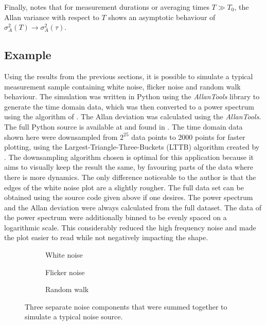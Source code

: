 Finally, \citeauthor{psd_to_adev} \cite{psd_to_adev} notes that for measurement durations or averaging times $T \gg T_0$, the Allan variance with respect to $T$ shows an asymptotic behaviour of $\sigma_A^2(T) \to \sigma_A^2(\tau)$.

\subsection{Example}%
\label{sec:noise_example}
Using the results from the previous sections, it is possible to simulate a typical measurement sample containing white noise, flicker noise and random walk behaviour. The simulation was written in Python using the \textit{AllanTools} library \cite{allantools} to generate the time domain data, which was then converted to a power spectrum using the algorithm of \citeauthor{welch} \cite{welch}. The Allan deviation was calculated using the \textit{AllanTools}. The full Python source is available at \cite{supplemental_material} and found in . The time domain data shown here were downsampled from $2^{25}$ data points to \num{2000} points for faster plotting, using the Largest-Triangle-Three-Buckets (LTTB) algorithm created by \citeauthor{lttb} \cite{lttb}. The downsampling algorithm chosen is optimal for this application because it aims to visually keep the result the same, by favouring parts of the data where there is more dynamics. The only difference noticeable to the author is that the edges of the white noise plot are a slightly rougher. The full data set can be obtained using the source code given above if one desires. The power spectrum and the Allan deviation were always calculated from the full dataset. The data of the power spectrum were additionally binned to be evenly spaced on a logarithmic scale. This considerably reduced the high frequency noise and made the plot easier to read while not negatively impacting the shape.

\begin{figure}[ht]
    \centering
    \begin{subfigure}{0.32\linewidth}
        \centering
        \scalebox{0.75}{%
            
        } %
        \caption{White noise}
    \end{subfigure}
    \begin{subfigure}{0.32\linewidth}
        \centering
        \scalebox{0.75}{%
            
        } %
        \caption{Flicker noise}
    \end{subfigure}
    \begin{subfigure}{0.32\linewidth}
        \centering
        \scalebox{0.75}{%
            
        } %
        \caption{Random walk}
    \end{subfigure}
    \caption{Three separate noise components that were summed together to simulate a typical noise source.}
    \label{fig:adev_example_noise_types}
\end{figure}

